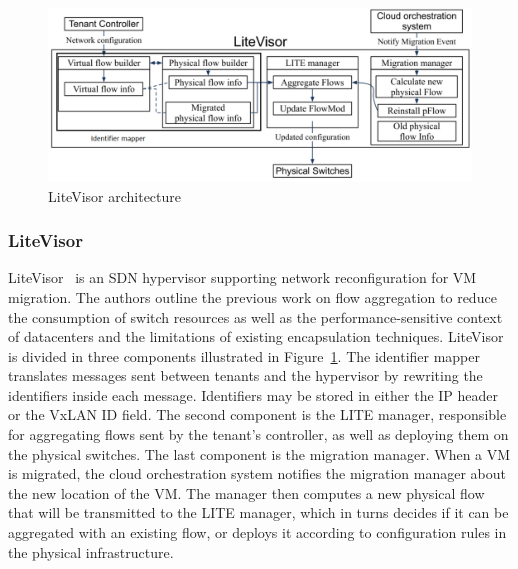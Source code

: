 

\begin{figure}[ht]
    \centering
    \includegraphics[scale=0.5]{figures/litevisor.pdf}
    \caption{LiteVisor architecture~\cite{Litevisor-Yang2018}}
    \label{fig:litevisor}
\end{figure}

\subsubsection{LiteVisor}
LiteVisor~\cite{Litevisor-Yang2018} is an SDN hypervisor supporting network reconfiguration for VM migration.
The authors outline the previous work on flow aggregation to reduce the consumption of switch resources as well as the performance-sensitive context of datacenters and the limitations of existing encapsulation techniques.
LiteVisor is divided in three components illustrated in Figure~\ref{fig:litevisor}. The identifier mapper translates messages sent between tenants and the hypervisor by rewriting the identifiers inside each message. Identifiers may be stored in either the IP header or the VxLAN ID field.
The second component is the LITE manager, responsible for aggregating flows sent by the tenant's controller, as well as deploying them on the physical switches. 
The last component is the migration manager. When a VM is migrated, the cloud orchestration system notifies the migration manager about the new location of the VM. The manager then computes a new physical flow that will be transmitted to the LITE manager, which in turns decides if it can be aggregated with an existing flow, or deploys it according to configuration rules in the physical infrastructure.

